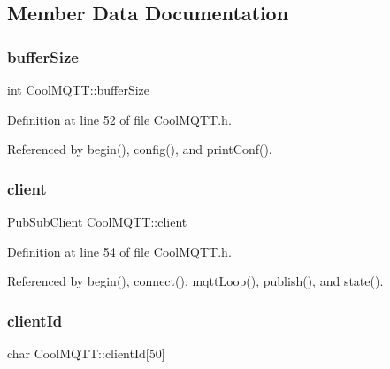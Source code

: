 \subsection{Member Data Documentation}
\mbox{\label{classCoolMQTT_a7f3cf26b51d6770f216e42c5ef13ca9f}} 
\subsubsection{\texorpdfstring{buffer\+Size}{bufferSize}}
{\footnotesize\ttfamily int Cool\+M\+Q\+T\+T\+::buffer\+Size\hspace{0.3cm}{\ttfamily [private]}}



Definition at line 52 of file Cool\+M\+Q\+T\+T.\+h.



Referenced by begin(), config(), and print\+Conf().

\mbox{\label{classCoolMQTT_a4ca71e4f76ef868692a297efd45b1415}} 
\subsubsection{\texorpdfstring{client}{client}}
{\footnotesize\ttfamily Pub\+Sub\+Client Cool\+M\+Q\+T\+T\+::client\hspace{0.3cm}{\ttfamily [private]}}



Definition at line 54 of file Cool\+M\+Q\+T\+T.\+h.



Referenced by begin(), connect(), mqtt\+Loop(), publish(), and state().

\mbox{\label{classCoolMQTT_af01bc6160c5a191e90df1b6e7318828d}} 
\subsubsection{\texorpdfstring{client\+Id}{clientId}}
{\footnotesize\ttfamily char Cool\+M\+Q\+T\+T\+::client\+Id\mbox{[}50\mbox{]}\hspace{0.3cm}{\ttfamily [private]}}




